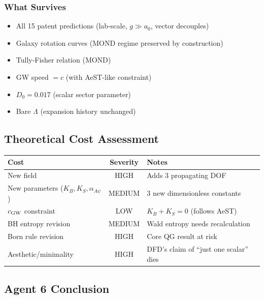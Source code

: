 \documentclass[11pt,a4paper]{article}
\begin{document}
\subsubsection{What Survives}

\begin{itemize}
\item All 15 patent predictions (lab-scale, $g \gg a_0$, vector decouples)
\item Galaxy rotation curves (MOND regime preserved by construction)
\item Tully-Fisher relation (MOND)
\item GW speed $= c$ (with AeST-like constraint)
\item $D_0 = 0.017$ (scalar sector parameter)
\item Bare $\Lambda$ (expansion history unchanged)
\end{itemize}

\subsection{Theoretical Cost Assessment}

\begin{center}
\begin{tabular}{lcl}
\toprule
\textbf{Cost} & \textbf{Severity} & \textbf{Notes} \\
\midrule
New field & HIGH & Adds 3 propagating DOF \\
New parameters ($K_B, K_S, \alpha_{A\psi}$) & MEDIUM & 3 new dimensionless constants \\
$c_{\rm GW}$ constraint & LOW & $K_B + K_S = 0$ (follows AeST) \\
BH entropy revision & MEDIUM & Wald entropy needs recalculation \\
Born rule revision & HIGH & Core QG result at risk \\
Aesthetic/minimality & HIGH & DFD's claim of ``just one scalar'' dies \\
\bottomrule
\end{tabular}
\end{center}

\subsection{Agent 6 Conclusion}
\end{document}
